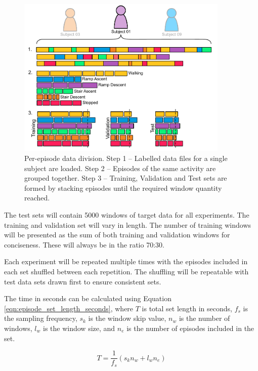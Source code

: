 \begin{figure}[hbt]
    \centering
    \includegraphics[width=0.9\textwidth]{content/5-Personalisation/Episode_Division.pdf}
    \caption[Per-episode data division]{Per-episode data division. Step 1 -- Labelled data files for a single subject are loaded. Step 2 -- Episodes of the same activity are grouped together. Step 3 -- Training, Validation and Test sets are formed by stacking episodes until the required window quantity reached.}
    \label{fig:methods-per-episode-data-division}
\end{figure}

The test sets will contain 5000 windows of target data for all experiments. The training and validation set will vary in length. The number of training windows will be presented as the sum of both training and validation windows for conciseness. These will always be in the ratio 70:30.

Each experiment will be repeated multiple times with the episodes included in each set shuffled between each repetition. The shuffling will be repeatable with test data sets drawn first to ensure consistent sets.

The time in seconds can be calculated using Equation \ref{eqn:episode_set_length_seconds}, where $T$ is total set length in seconds, $f_s$ is the sampling frequency, $s_k$ is the window skip value, $n_w$ is the number of windows, $l_w$ is the window size, and $n_e$ is the number of episodes included in the set.

\begin{equation}
    T = \frac{1}{f_s}(s_k n_w + l_w n_e)
    \label{eqn:episode_set_length_seconds}
\end{equation}

